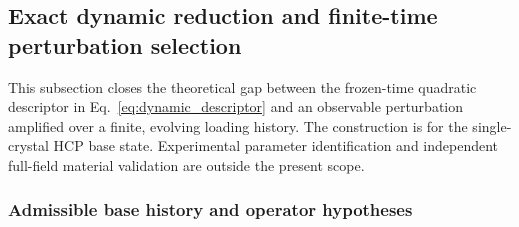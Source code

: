 \subsection{Exact dynamic reduction and finite-time perturbation selection}
\label{subsec:dynamic_finite_time_operator}

This subsection closes the theoretical gap between the frozen-time quadratic
descriptor in Eq.~\eqref{eq:dynamic_descriptor} and an observable perturbation
amplified over a finite, evolving loading history.  The construction is for the
single-crystal HCP base state.  Experimental parameter identification and
independent full-field material validation are outside the present scope.

\subsubsection{Admissible base history and operator hypotheses}

